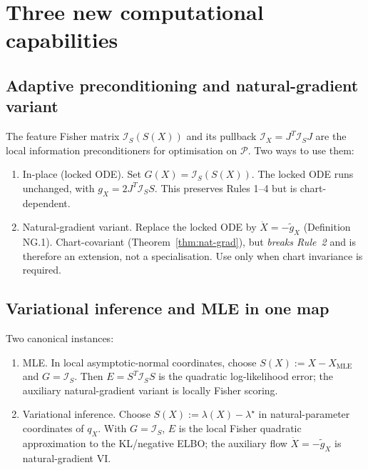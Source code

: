 \documentclass[11pt,oneside]{amsart}
\def\textbf#1{#1}%
\theoremstyle{plain}
\theoremstyle{definition}
\newcommand{\Xdot}{\dot{X}}
\newcommand{\gX}{g_X}
\begin{document}
\section{Three new computational capabilities}
\label{sec:fisher-compute}

\subsection{Adaptive preconditioning and natural-gradient variant}

The feature Fisher matrix $\mathcal{I}_{S}(S(X))$ and its pullback
$\mathcal{I}_{X}=J^{T}\mathcal{I}_{S}J$ are the local information
preconditioners for optimisation on $\mathcal{P}$. Two ways to use them:
\begin{enumerate}[leftmargin=1.8em,nosep]
    \item \textbf{In-place (locked ODE).} Set $G(X) = \mathcal{I}_{S}(S(X))$.
      The locked ODE runs unchanged, with $\gX = 2 J^{T}\mathcal{I}_{S} S$.
        This preserves Rules 1--4 but is chart-dependent.
  \item \textbf{Natural-gradient variant.} Replace the locked ODE by
        $\Xdot = -\widetilde\gX$ (Definition NG.1). Chart-covariant
        (Theorem~\ref{thm:nat-grad}), but \emph{breaks Rule~2} and is
        therefore an extension, not a specialisation. Use only when
        chart invariance is required.
\end{enumerate}

\subsection{Variational inference and MLE in one map}

Two canonical instances:
\begin{enumerate}[leftmargin=1.8em,nosep]
  \item \textbf{MLE.} In local asymptotic-normal coordinates, choose
    $S(X):=X-X_{\mathrm{MLE}}$ and $G=\mathcal{I}_{S}$. Then
    $E=S^{T}\mathcal{I}_{S}S$ is the quadratic log-likelihood error;
    the auxiliary natural-gradient variant is locally Fisher scoring.
  \item \textbf{Variational inference.} Choose $S(X) :=
    \lambda(X)-\lambda^{\star}$ in natural-parameter coordinates of
    $q_{X}$. With $G=\mathcal{I}_{S}$, $E$ is the local Fisher
    quadratic approximation to the KL/negative ELBO; the auxiliary
    flow $\dot X=-\widetilde\gX$ is natural-gradient VI.
\end{enumerate}
\end{document}
